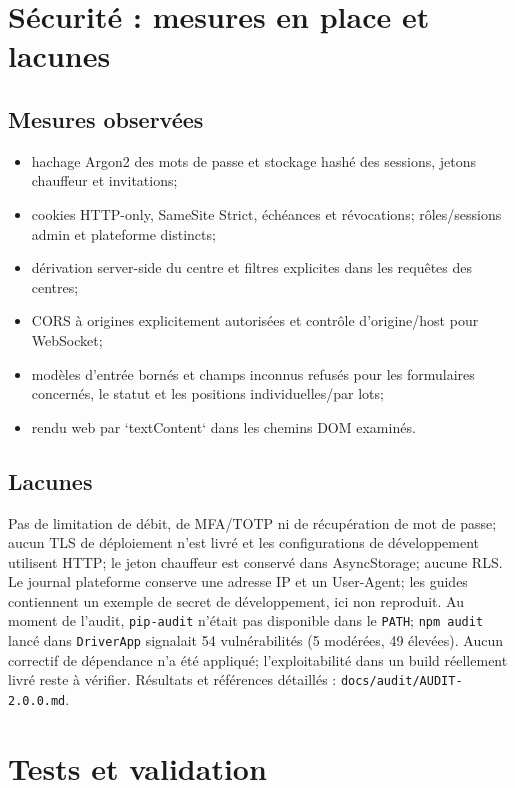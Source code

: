 \documentclass[12pt,a4paper]{article}
\begin{document}
\section{Sécurité : mesures en place et lacunes}

\subsection{Mesures observées}
\begin{itemize}
\item hachage Argon2 des mots de passe et stockage hashé des sessions, jetons chauffeur et invitations;
\item cookies HTTP-only, SameSite Strict, échéances et révocations; rôles/sessions admin et plateforme distincts;
\item dérivation server-side du centre et filtres explicites dans les requêtes des centres;
\item CORS à origines explicitement autorisées et contrôle d'origine/host pour WebSocket;
\item modèles d'entrée bornés et champs inconnus refusés pour les formulaires concernés, le statut et les positions individuelles/par lots;
\item rendu web par `textContent` dans les chemins DOM examinés.
\end{itemize}

\subsection{Lacunes}
Pas de limitation de débit, de MFA/TOTP ni de récupération de mot de passe; aucun TLS de déploiement n'est livré et les configurations de développement utilisent HTTP; le jeton chauffeur est conservé dans AsyncStorage; aucune RLS. Le journal plateforme conserve une adresse IP et un User-Agent; les guides contiennent un exemple de secret de développement, ici non reproduit. Au moment de l'audit, \texttt{pip-audit} n'était pas disponible dans le \texttt{PATH}; \texttt{npm audit} lancé dans \texttt{DriverApp} signalait 54 vulnérabilités (5 modérées, 49 élevées). Aucun correctif de dépendance n'a été appliqué; l'exploitabilité dans un build réellement livré reste à vérifier. Résultats et références détaillés : \texttt{docs/audit/AUDIT-2.0.0.md}.

\section{Tests et validation}
\end{document}
